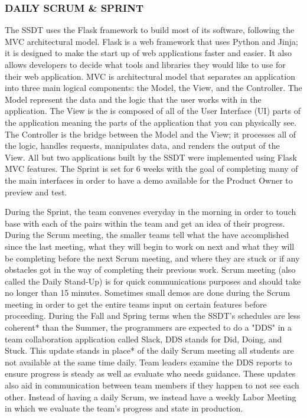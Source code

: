 \subsubsection{ DAILY SCRUM \& SPRINT} %
The SSDT uses the Flask framework to build most of its software, following the MVC architectural model. Flask is a web framework that uses Python and Jinja; it is designed to make the start up of web applications faster and easier. It also allows developers to decide what tools and libraries they would like to use for their web application. MVC is architectural model that separates an application into three main logical components: the Model, the View, and the Controller. The Model represent the data and the logic that the user works with in the application. The View is the is composed of all of the User Interface (UI) parts of the application meaning the parts of the application that you can physically see. The Controller is the bridge between the Model and the View; it processes all of the logic, handles requests, manipulates data, and renders the output of the View. All but two applications built by the SSDT were implemented using Flask MVC features. The Sprint is set for 6 weeks with the goal of completing many of the main interfaces in order to have a demo available for  the Product Owner to preview and test.

During the Sprint, the team convenes everyday in the morning in order to touch base with each of the pairs within the team and get an idea of their progress. During the Scrum meeting, the smaller teams tell what the have accomplished since the last meeting, what they will begin to work on next and what they will be completing before the next Scrum meeting, and where they are stuck or if any obstacles got in the way of completing their previous work. Scrum meeting (also called the Daily Stand-Up) is for quick communications purposes and should take no longer than 15 minutes. Sometimes small demos are done during the Scrum meeting in order to get the entire teams input on certain features before proceeding. During the Fall and Spring terms when the SSDT's schedules are less coherent* than the Summer, the programmers are expected to do a "DDS" in a team collaboration application called Slack, DDS stands for Did, Doing, and Stuck. This update stands in place* of the daily Scrum meeting all students are not available at the same time daily. Team leaders examine the DDS reports to ensure progress is steady as well as evaluate who needs guidance. These updates also aid in communication between team members if they happen to not see each other. Instead of having a daily Scrum, we instead have a weekly Labor Meeting in which we evaluate the team's progress and state in production.

